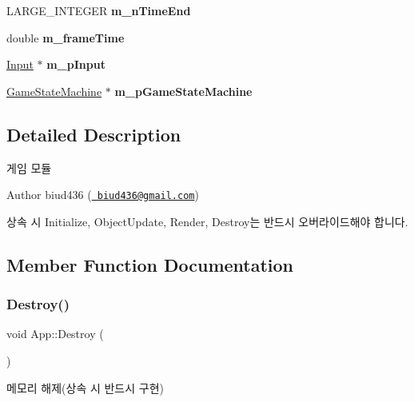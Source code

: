 \begin{DoxyCompactItemize}
L\+A\+R\+G\+E\+\_\+\+I\+N\+T\+E\+G\+ER {\bfseries m\+\_\+n\+Time\+End}
\item 
\mbox{\label{class_app_adb145d6c7d54e54fade3a40b82b25234}} 
double {\bfseries m\+\_\+frame\+Time}
\item 
\mbox{\label{class_app_a30b86b24c5e7c87581e72a28ba4909e7}} 
\mbox{\hyperlink{class_input}{Input}} $\ast$ {\bfseries m\+\_\+p\+Input}
\item 
\mbox{\label{class_app_ae397eb755f3191f9271fc46969ead409}} 
\mbox{\hyperlink{class_game_state_machine}{Game\+State\+Machine}} $\ast$ {\bfseries m\+\_\+p\+Game\+State\+Machine}
\end{DoxyCompactItemize}


\subsection{Detailed Description}
게임 모듈 

\begin{DoxyAuthor}{Author}
biud436 (\href{mailto:biud436@gmail.com}{\texttt{ biud436@gmail.\+com}})
\end{DoxyAuthor}
상속 시 Initialize, Object\+Update, Render, Destroy는 반드시 오버라이드해야 합니다. 

\subsection{Member Function Documentation}
\mbox{\label{class_app_a66dd2456f5144a9747d6ebb291d9ead4}} 
\subsubsection{\texorpdfstring{Destroy()}{Destroy()}}
{\footnotesize\ttfamily void App\+::\+Destroy (\begin{DoxyParamCaption}{ }\end{DoxyParamCaption})\hspace{0.3cm}{\ttfamily [virtual]}}

메모리 해제(상속 시 반드시 구현) \mbox{\label{class_app_abeb7ab54b4636fc9632edbe0892e01b3}} 

